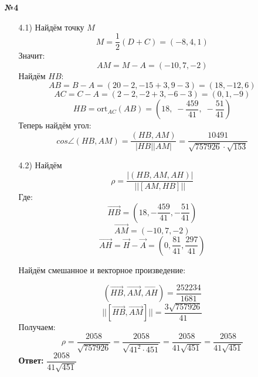 \documentclass[a4paper]{article}
\renewcommand{\f}[2]{\frac{#1}{#2}}
\begin{document}
\begin{enumerate}
    \item[\textbf{№4}]\begin{enumerate}
        \item[4.1)] Найдём точку $M$
        $$M = \f{1}{2}(D+C) = (-8, 4, 1)$$
        Значит:
        $$AM = M - A = (-10, 7, -2)$$
        Найдём $HB$:
        $$AB = B - A = (20-2, -15+3, 9-3) = (18, -12, 6)$$
        $$AC = C - A = (2- 2, -2 +3, -6-3) = (0, 1, -9)$$
        $$HB = \text{ort}_{AC} (AB) =  \left(18,\; -\frac{459}{41},\; -\frac{51}{41}\right)$$
        Теперь найдём угол:
        $$cos \angle (HB, AM) = \f{(HB, AM)}{|HB||AM|} = \dfrac{10491}{\sqrt{757926} \cdot \sqrt{153}}$$


        \item[4.2)]Найдём 
        $$\rho = \f{|(HB, AM, AH)|}{||[AM, HB]||}$$
        Где:
        \[ \overrightarrow{HB} = \left(18, -\dfrac{459}{41}, -\dfrac{51}{41}\right) \]
        \[ \overrightarrow{AM} = (-10, 7, -2) \]
        \[ \overrightarrow{AH} = \overrightarrow{H} - \overrightarrow{A} = \left(0, \dfrac{81}{41}, \dfrac{297}{41}\right) \]
        
        Найдём смешанное и векторное произведение:
        
        \[ (\overrightarrow{HB}, \overrightarrow{AM}, \overrightarrow{AH}) = \dfrac{252234}{1681}\]
        \[
        ||[\overrightarrow{HB}, \overrightarrow{AM}]|| = \dfrac{3\sqrt{757926}}{41}
        \]
        Получаем:
        $$\rho =  \dfrac{2058}{\sqrt{757926}} = \dfrac{2058}{\sqrt{41^2 \cdot 451}} = \dfrac{2058}{41\sqrt{451}} = \dfrac{2058}{41\sqrt{451}}$$
        \textbf{Ответ: } $\dfrac{2058}{41\sqrt{451}}$
    \end{enumerate}


\end{enumerate}
\end{document}
